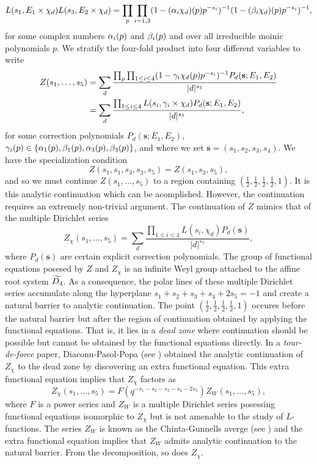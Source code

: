 \documentclass[12pt,reqno,oneside]{amsart}
\begin{document}
\[
  L(s_{1},E_{1} \times \chi_{d})L(s_{3},E_{2} \times \chi_{d}) = \prod_{p}\prod_{i = 1,3}(1-(\alpha_{i}\chi_{d})(p)p^{-s_{i}})^{-1}(1-(\beta_{i}\chi_{d})(p)p^{-s_{i}})^{-1},
\]
for some complex numbers $\alpha_{i}(p)$ and $\beta_{i}(p)$ and over all irreducible moinic polynomials $p$. We stratify the four-fold product into four different variables to write
\begin{align*}
  Z(s_{1},\ldots,s_{5}) &= \sum_{d}\frac{\prod_{p}\prod_{1 \le i \le 4}(1-\gamma_{i}\chi_{d}(p)p^{-s_{i}})^{-1}P_{d}(\mathbf{s};E_{1},E_{2})}{|d|^{s_{5}}} \\
  &= \sum_{d}\frac{\prod_{1 \le i \le 4}L(s_{i},\gamma_{i} \times \chi_{d})P_{d}(\mathbf{s};E_{1},E_{2})}{|d|^{s_{5}}},
\end{align*}
for some correction polynomials $P_{d}(\mathbf{s};E_{1},E_{2})$, $\gamma_{i}(p) \in \{\alpha_{1}(p),\beta_{1}(p),\alpha_{3}(p),\beta_{3}(p)\}$, and where we set $\mathbf{s} = (s_{1},s_{2},s_{3},s_{4})$. We have the specialization condition
\begin{equation}\label{equ:specialization}
  Z(s_{1},s_{1},s_{3},s_{3},s_{5}) = Z(s_{1},s_{3},s_{5}), 
\end{equation}
and so we must continue $Z(s_{1},\ldots,s_{5})$ to a region containing $\left(\frac{1}{2},\frac{1}{2},\frac{1}{2},\frac{1}{2},1\right)$. It is this analytic continuation which can be acomplished. However, the continuation requires an extremely non-trivial argument. The continuation of $Z$ mimics that of the multiple Dirichlet series
\[
  Z_{\chi}(s_{1},\ldots,s_{5}) = \sum_{d}\frac{\prod_{1 \le i \le 4}L(s_{i},\chi_{d})P_{d}(\mathbf{s})}{|d|^{s_{5}}},
\]
where $P_{d}(\mathbf{s})$ are certain explicit correction polynomials. The group of functional equations posesed by $Z$ and $Z_{\chi}$ is an infinite Weyl group attached to the affine root system $\widetilde{D_{4}}$. As a consequence, the polar lines of these multiple Dirichlet series accumulate along the hyperplane $s_{1}+s_{2}+s_{3}+s_{4}+2s_{5} = -1$ and create a natural barrier to analytic continuation. The point $\left(\frac{1}{2},\frac{1}{2},\frac{1}{2},\frac{1}{2},1\right)$ occures before the natural barrier but after the region of continuation obtained by applying the functional equations. That is, it lies in a \textit{dead zone} where continuation should be possible but cannot be obtained by the functional equations directly. In a \textit{tour-de-force} paper, Diaconu-Pasol-Popa (see ) obtained the analytic continuation of $Z_{\chi}$ to the dead zone by discovering an extra functional equation. This extra functional equation implies that $Z_{\chi}$ factors as
\[
  Z_{\chi}(s_{1},\ldots,s_{5}) = F(q^{-s_{1}-s_{2}-s_{3}-s_{4}-2s_{5}})Z_{W}(s_{1},\ldots,s_{5}),
\]
where $F$ is a power series and $Z_{W}$ is a multiple Dirichlet series posessing functional equations isomorphic to $Z_{\chi}$ but is not amenable to the study of $L$-functions. The series $Z_{W}$ is known as the Chinta-Gunnells averge (see ) and the extra functional equation implies that $Z_{W}$ admits analytic continuation to the natural barrier. From the decomposition, so does $Z_{\chi}$.
\end{document}
